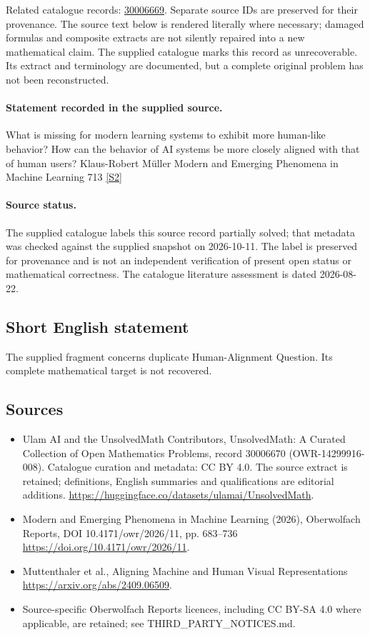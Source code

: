 \documentclass[11pt]{article}
\begin{document}
Related catalogue records: \href{https://mehmetmars7.github.io/Erdosproblems-llm-hunter/problem.html?type=open_problems&id=30006669}{30006669}. Separate source IDs are preserved for their provenance.
The source text below is rendered literally where necessary; damaged formulas and composite extracts are not silently repaired into a new mathematical claim.
The supplied catalogue marks this record as unrecoverable. Its extract and terminology are documented, but a complete original problem has not been reconstructed.
\paragraph{Statement recorded in the supplied source.}
What is missing for modern learning systems to exhibit more human-like behavior? How can the behavior of AI systems be more closely aligned with that of human users? Klaus-Robert Müller Modern and Emerging Phenomena in Machine Learning 713 \href{https://doi.org/10.4171/owr/2026/11}{[S2]}
\paragraph{Source status.}
The supplied catalogue labels this source record partially solved; that metadata was checked against the supplied snapshot on 2026-10-11. The label is preserved for provenance and is not an independent verification of present open status or mathematical correctness. The catalogue literature assessment is dated 2026-08-22.
\subsection{Short English statement}
The supplied fragment concerns duplicate Human-Alignment Question. Its complete mathematical target is not recovered.
\subsection{Sources}
\begin{itemize}
\item[S1] Ulam AI and the UnsolvedMath Contributors, UnsolvedMath: A Curated Collection of Open Mathematics Problems, record 30006670 (OWR-14299916-008). Catalogue curation and metadata: CC BY 4.0. The source extract is retained; definitions, English summaries and qualifications are editorial additions.
\url{https://huggingface.co/datasets/ulamai/UnsolvedMath}.
\item[S2] Modern and Emerging Phenomena in Machine Learning (2026), Oberwolfach Reports, DOI 10.4171/owr/2026/11, pp. 683--736
\url{https://doi.org/10.4171/owr/2026/11}.
\item[S3] Muttenthaler et al., Aligning Machine and Human Visual Representations
\url{https://arxiv.org/abs/2409.06509}.
\item Source-specific Oberwolfach Reports licences, including CC BY-SA 4.0 where applicable, are retained; see THIRD\_PARTY\_NOTICES.md.
\end{itemize}
\end{document}
